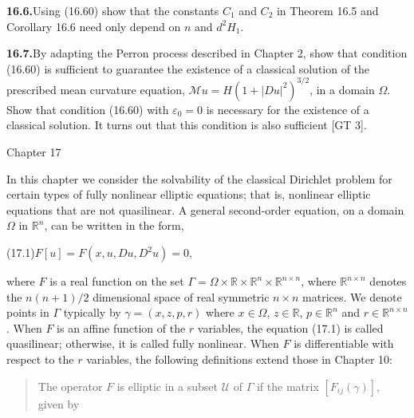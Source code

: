 

\noindent\textbf{16.6.}\quad Using (16.60) show that the constants $C_1$ and $C_2$ in Theorem 16.5 and
Corollary 16.6 need only depend on $n$ and $d^2 H_1$.

\medskip

\noindent\textbf{16.7.}\quad By adapting the Perron process described in Chapter 2, show that condition
(16.60) is sufficient to guarantee the existence of a classical solution of the prescribed
mean curvature equation, $\mathcal M u = H(1+|Du|^2)^{3/2}$, in a domain $\Omega$. Show that
condition (16.60) with $\varepsilon_0 = 0$ is necessary for the existence of a classical solution.
It turns out that this condition is also sufficient [GT 3].




\noindent Chapter 17

\bigskip


\vspace{2.5cm}

\noindent In this chapter we consider the solvability of the classical Dirichlet problem for
certain types of fully nonlinear elliptic equations; that is, nonlinear elliptic equations
that are not quasilinear. A general second-order equation, on a domain $\Omega$ in $\mathbb{R}^n$,
can be written in the form,

\medskip

\noindent (17.1)\quad $F[u] = F(x,u,Du,D^2u) = 0,$

\medskip

\noindent where $F$ is a real function on the set $\Gamma = \Omega \times \mathbb{R} \times \mathbb{R}^n \times \mathbb{R}^{n\times n}$, where $\mathbb{R}^{n\times n}$ denotes
the $n(n+1)/2$ dimensional space of real symmetric $n \times n$ matrices. We denote
points in $\Gamma$ typically by $\gamma = (x, z, p, r)$ where $x \in \Omega$, $z \in \mathbb{R}$, $p \in \mathbb{R}^n$ and $r \in \mathbb{R}^{n\times n}$. When
$F$ is an affine function of the $r$ variables, the equation (17.1) is called quasilinear;
otherwise, it is called fully nonlinear. When $F$ is differentiable with respect to the $r$
variables, the following definitions extend those in Chapter 10:

\begin{quote}
The operator $F$ is elliptic in a subset $\mathcal U$ of $\Gamma$ if the matrix $[F_{ij}(\gamma)]$, given by
\end{quote}

